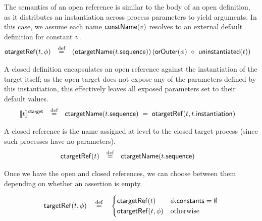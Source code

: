 \begin{defn}
The semantics of an open reference is similar to the body of an open definition,
as it distributes an instantiation across process parameters to yield arguments.
In this case, we assume each name \(\mathsf{constName}(v)\) resolves to an
external default definition for constant \(v\).
%
\begin{align*}
	\otargetRef{\atarget}{\aninst}
\quad\defeq\quad&
	(\otargetnameOf{\field{\atarget}{sequence}})
	\left(
	\funcname{orOuter}(\aninst)\ \circ\ \funcname{uninstantiated}(\atarget)
	\right)
\end{align*}
\end{defn}

\begin{defn}
A closed definition encapsulates an open reference against the instantiation of
the target itself; as the open target does not expose any of the parameters
defined by this instantiation, this effectively leaves all exposed parameters
set to their default values.
%
\begin{align*}
	\llbracket t \rrbracket^{\mathsf{ctarget}}
\quad\mathbin{\overset{\text{def}}=}\quad&
	\mathsf{ctargetName}(t.\mathsf{sequence})
	\;=\;
	\mathsf{otargetRef}(t, t.\mathsf{instantiation})
\end{align*}
\end{defn}

\begin{defn}
A closed reference is the name assigned at \msequence{} level to the closed
target process (since such processes have no parameters).
%
\begin{align*}
\mathsf{ctargetRef}(t)
\quad\mathbin{\overset{\text{def}}=}\quad&
\mathsf{ctargetName}(t.\mathsf{sequence})
\end{align*}
\end{defn}

Once we have the open and closed references, we can choose between them
depending on whether an assertion \mtargetinstantiation{} is empty.

\begin{defn}
\begin{align*}
\mathsf{targetRef}(t, \phi)
\quad\mathbin{\overset{\text{def}}=}\quad
\begin{cases}
	\mathsf{ctargetRef}(t) & \phi.\mathsf{constants} = \emptyset
	\\
	\mathsf{otargetRef}(t, \phi) & \text{otherwise}
\end{cases}
\end{align*}
\end{defn}

